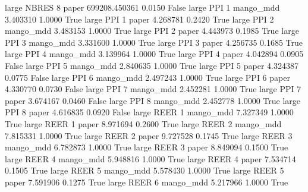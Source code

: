      large    NBRES                 8                 paper 699208.450361      0.0150   False
     large      PPI                 1             mango_mdd      3.403310      1.0000    True
     large      PPI                 1                 paper      4.268781      0.2420    True
     large      PPI                 2             mango_mdd      3.483153      1.0000    True
     large      PPI                 2                 paper      4.443973      0.1985    True
     large      PPI                 3             mango_mdd      3.331600      1.0000    True
     large      PPI                 3                 paper      4.256735      0.1685    True
     large      PPI                 4             mango_mdd      3.139964      1.0000    True
     large      PPI                 4                 paper      4.042894      0.0905   False
     large      PPI                 5             mango_mdd      2.840635      1.0000    True
     large      PPI                 5                 paper      4.324387      0.0775   False
     large      PPI                 6             mango_mdd      2.497243      1.0000    True
     large      PPI                 6                 paper      4.330770      0.0730   False
     large      PPI                 7             mango_mdd      2.452281      1.0000    True
     large      PPI                 7                 paper      3.674167      0.0460   False
     large      PPI                 8             mango_mdd      2.452778      1.0000    True
     large      PPI                 8                 paper      4.616835      0.0920   False
     large     REER                 1             mango_mdd      7.327349      1.0000    True
     large     REER                 1                 paper      8.971694      0.2600    True
     large     REER                 2             mango_mdd      7.815331      1.0000    True
     large     REER                 2                 paper      9.727528      0.1745    True
     large     REER                 3             mango_mdd      6.782873      1.0000    True
     large     REER                 3                 paper      8.849094      0.1500    True
     large     REER                 4             mango_mdd      5.948816      1.0000    True
     large     REER                 4                 paper      7.534714      0.1505    True
     large     REER                 5             mango_mdd      5.578430      1.0000    True
     large     REER                 5                 paper      7.591906      0.1275    True
     large     REER                 6             mango_mdd      5.217966      1.0000    True

